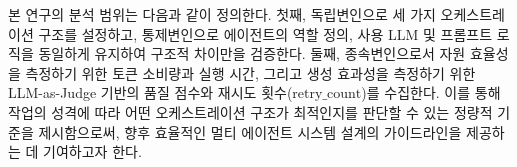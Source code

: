 본 연구의 분석 범위는 다음과 같이 정의한다. 첫째, 독립변인으로 세 가지 오케스트레이션 구조를 설정하고, 통제변인으로 에이전트의 역할 정의, 사용 LLM 및 프롬프트 로직을 동일하게 유지하여 구조적 차이만을 검증한다. 둘째, 종속변인으로서 자원 효율성을 측정하기 위한 토큰 소비량과 실행 시간, 그리고 생성 효과성을 측정하기 위한 LLM-as-Judge 기반의 품질 점수와 재시도 횟수($\text{retry\_count}$)를 수집한다. 이를 통해 작업의 성격에 따라 어떤 오케스트레이션 구조가 최적인지를 판단할 수 있는 정량적 기준을 제시함으로써, 향후 효율적인 멀티 에이전트 시스템 설계의 가이드라인을 제공하는 데 기여하고자 한다.